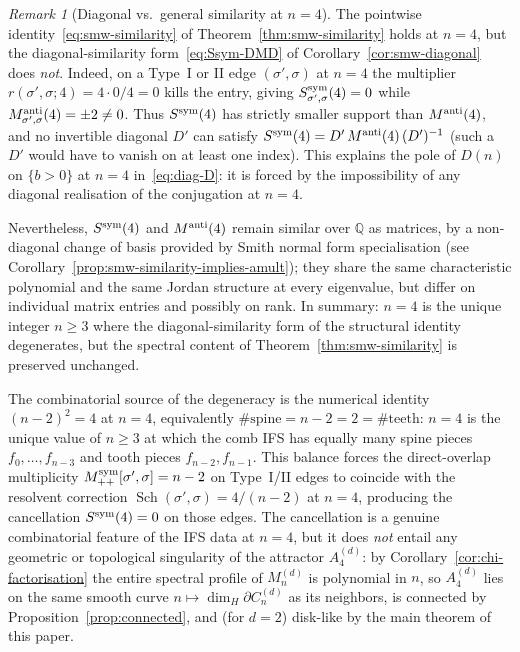 \documentclass{amsart}
\theoremstyle{definition}
\theoremstyle{remark}
\newtheorem{remark}[theorem]{Remark}
\begin{document}
\begin{remark}[Diagonal vs.\ general similarity at $n = 4$]
\label{rem:n-equals-4}
The pointwise identity~\eqref{eq:smw-similarity} of
Theorem~\ref{thm:smw-similarity} holds at $n = 4$, but the
diagonal-similarity form~\eqref{eq:Ssym-DMD} of
Corollary~\ref{cor:smw-diagonal} does \emph{not}.  Indeed, on a
Type~I or II edge $(\sigma', \sigma)$ at $n = 4$ the multiplier
$r(\sigma', \sigma; 4) = 4 \cdot 0/4 = 0$ kills the entry,
giving $S^{\rm sym}_{\sigma',\sigma}(4) = 0$ while
$M^{\rm anti}_{\sigma',\sigma}(4) = \pm 2 \ne 0$.  Thus
$S^{\rm sym}(4)$ has strictly smaller support than
$M^{\rm anti}(4)$, and no invertible diagonal $D'$ can satisfy
$S^{\rm sym}(4) = D'\,M^{\rm anti}(4)\,(D')^{-1}$
\textup{(}such a $D'$ would have to vanish on at least one
index\textup{)}.  This explains the pole of
$D(n)$ on $\{b > 0\}$ at $n = 4$ in~\eqref{eq:diag-D}: it is
forced by the impossibility of any diagonal realisation of the
conjugation at $n = 4$.

Nevertheless, $S^{\rm sym}(4)$ and $M^{\rm anti}(4)$ remain
similar over $\mathbb Q$ as matrices, by a non-diagonal change
of basis provided by Smith normal form specialisation
\textup{(}see Corollary~\ref{prop:smw-similarity-implies-amult}\textup{)};
they share the same characteristic polynomial and the same
Jordan structure at every eigenvalue, but differ on individual
matrix entries and possibly on rank.  In summary: $n = 4$ is
the unique integer $n \ge 3$ where the diagonal-similarity
form of the structural identity degenerates, but the spectral
content of Theorem~\ref{thm:smw-similarity} is preserved
unchanged.

The combinatorial source of the degeneracy is the numerical
identity $(n-2)^2 = 4$ at $n = 4$, equivalently $\#\text{spine}
= n - 2 = 2 = \#\text{teeth}$: $n = 4$ is the unique value of
$n \ge 3$ at which the comb IFS has equally many spine pieces
$f_0, \ldots, f_{n-3}$ and tooth pieces $f_{n-2}, f_{n-1}$.
This balance forces the direct-overlap multiplicity
$M_{++}^{\rm sym}[\sigma',\sigma] = n - 2$ on Type~I/II edges
to coincide with the resolvent correction
$\operatorname{Sch}(\sigma',\sigma) = 4/(n-2)$ at $n = 4$,
producing the cancellation
$S^{\rm sym}(4) = 0$ on those edges.  The cancellation is a
genuine combinatorial feature of the IFS data at $n = 4$, but
it does \emph{not} entail any geometric or topological
singularity of the attractor $A_4^{(d)}$: by
Corollary~\ref{cor:chi-factorisation} the entire spectral
profile of $M_n^{(d)}$ is polynomial in $n$, so $A_4^{(d)}$ lies
on the same smooth curve $n \mapsto \dim_H \partial C_n^{(d)}$
as its neighbors, is connected by Proposition~\ref{prop:connected},
and \textup{(}for $d = 2$\textup{)} disk-like by the main
theorem of this paper.
\end{remark}
\end{document}
